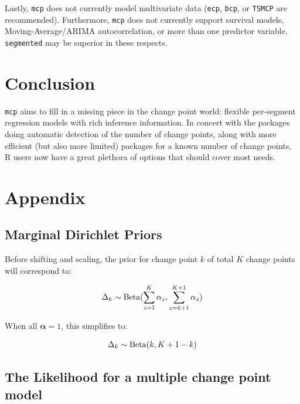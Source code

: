 \documentclass[
  american,
]{article}
\begin{document}
Lastly, \texttt{mcp} does not currently model multivariate data (\texttt{ecp}, \texttt{bcp}, or \texttt{TSMCP} are recommended). Furthermore, \texttt{mcp} does not currently support survival models, Moving-Average/ARIMA autocorrelation, or more than one predictor variable. \texttt{segmented} may be superior in these respects.

\hypertarget{conclusion}{%
\section{Conclusion}\label{conclusion}}

\texttt{mcp} aims to fill in a missing piece in the change point world: flexible per-segment regression models with rich inference information. In concert with the packages doing automatic detection of the number of change points, along with more efficient (but also more limited) packages for a known number of change points, R users now have a great plethora of options that should cover most needs.

\hypertarget{appendix}{%
\section{Appendix}\label{appendix}}

\hypertarget{marginal-dirichlet-priors}{%
\subsection{Marginal Dirichlet Priors}\label{marginal-dirichlet-priors}}

Before shifting and scaling, the prior for change point \(k\) of total \(K\) change points will correspond to:

\begin{equation}
\Delta_k \sim {\rm Beta}(\sum_{z = 1}^K \alpha_z, \sum_{z=k+1}^{K+1} \alpha_z)
\end{equation}

When all \(\mathbf{\alpha} = 1\), this simplifies to:

\begin{equation}
\Delta_k \sim {\rm Beta}(k, K + 1 - k)
\end{equation}

\hypertarget{the-likelihood-for-a-multiple-change-point-model}{%
\subsection{The Likelihood for a multiple change point model}\label{the-likelihood-for-a-multiple-change-point-model}}
\end{document}
